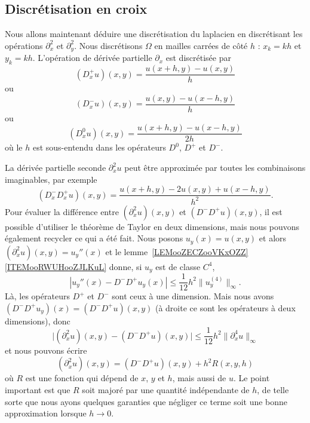 

\subsection{Discrétisation en croix}

Nous allons maintenant déduire une discrétisation du laplacien en discrétisant les opérations \( \partial^2_x\) et \( \partial^2_y\). Nous discrétisons \( \Omega\) en mailles carrées de côté \( h\) : \( x_k=kh\) et \( y_k=kh\). L'opération de dérivée partielle \( \partial_x\) est discrétisée par
\begin{equation}
	(D_x^+u)(x,y)=\frac{ u(x+h,y)-u(x,y) }{ h }
\end{equation}
ou
\begin{equation}
	(D_x^-u)(x,y)=\frac{ u(x,y)-u(x-h,y) }{ h }
\end{equation}
ou
\begin{equation}
	(D^0_xu)(x,y)=\frac{ u(x+h,y)-u(x-h,y) }{ 2h }
\end{equation}
où le \( h\) est sous-entendu dans les opérateurs \( D^0\), \( D^+\) et \( D^-\).

La dérivée partielle seconde \( \partial^2_xu\) peut être approximée par toutes les combinaisons imaginables, par exemple
\begin{equation}
	(D^-_xD^+_xu)(x,y)=\frac{ u(x+h,y)-2u(x,y)+u(x-h,y) }{ h^2 }.
\end{equation}
Pour évaluer la différence entre \( (\partial^2_xu)(x,y)\) et \( (D^-D^+u)(x,y)\), il est possible d'utiliser le théorème de Taylor en deux dimensions, mais nous pouvons également recycler ce qui a été fait. Nous posons \( u_y(x)=u(x,y)\) et alors \( (\partial_x^2u)(x,y)=u_y''(x)\) et le lemme~\ref{LEMooZECZooVKxOZZ}\ref{ITEMooRWUHooZJLKuL} donne, si \( u_y\) est de classe \( C^4\),
\begin{equation}
	| u_y''(x)-D^-D^+u_y(x) |\leq \frac{1}{ 12 }h^2\| u_y^{(4)} \|_{\infty}.
\end{equation}
Là, les opérateurs \( D^+\) et \( D^-\) sont ceux à une dimension. Mais nous avons \( (D^-D^+u_y)(x)=(D^-D^+u)(x,y)\) (à droite ce sont les opérateurs à deux dimensions), donc
\begin{equation}
	\big| (\partial^2_xu)(x,y)-(D^-D^+u)(x,y) \big|\leq \frac{1}{ 12 }h^2\| \partial^4_xu \|_{\infty}
\end{equation}
et nous pouvons écrire
\begin{equation}        \label{EQooCLSCooYLYJkU}
	(\partial^2_xu)(x,y)=(D^-D^+u)(x,y)+h^2R(x,y,h)
\end{equation}
où \( R\) est une fonction qui dépend de \( x\), \( y\) et \( h\), mais aussi de \( u\). Le point important est que \( R\) soit majoré par une quantité indépendante de \( h\), de telle sorte que nous ayons quelques garanties que négliger ce terme soit une bonne approximation lorsque \( h\to 0\).


